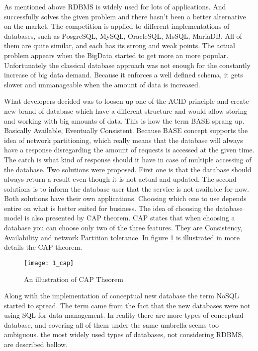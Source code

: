 As mentioned above RDBMS is widely used for lots of applications. And successfully solves the given problem and there hasn't been a better alternative on the market. The competition is applied to different implementations of databases, such as PosgreSQL, MySQL, OracleSQL, MsSQL, MariaDB. All of them are quite similar, and each has its strong and weak points. The actual problem appears when the BigData started to get more an more popular. Unfortunately the classical database approach was not enough for the constantly increase of big data demand. Because it enforces a well defined schema, it gets slower and unmanageable when the amount of data is increased.

What developers decided was to loosen up one of the ACID principle and create new brand of database which have a different structure and would allow storing and working with big amounts of data. This is how the term BASE sprang up. Basically Available, Eventually Consistent. Because BASE concept supports the idea of network partitioning, which really means that the database will always have a response disregarding the amount of requests is accessed at the given time. The catch is what kind of response should it have in case of multiple accessing of the database. Two solutions were proposed. First one is that the database should always return a result even though it is not actual and updated. The second solutions is to inform the database user that the service is not available for now. Both solutions have their own applications. Choosing which one to use depends entire on what is better suited for business. The idea of choosing the database model is also presented by CAP theorem. CAP states that when choosing a database you can choose only two of the three features. They are Consistency, Availability and network Partition tolerance. In figure \ref{cap} is illustrated in more details the CAP theorem.

\begin{figure}[!ht]
\centering
\texttt{[image: 1\_cap]}
\caption{An illustration of CAP Theorem}\label{cap}
\end{figure}

Along with the implementation of conceptual new database the term NoSQL started to spread. The term came from the fact that the new databases were not using SQL for data management. In reality there are more types of conceptual database, and covering all of them under the same umbrella seems too ambiguous.
the most widely used types of databases, not considering RDBMS, are described bellow.

